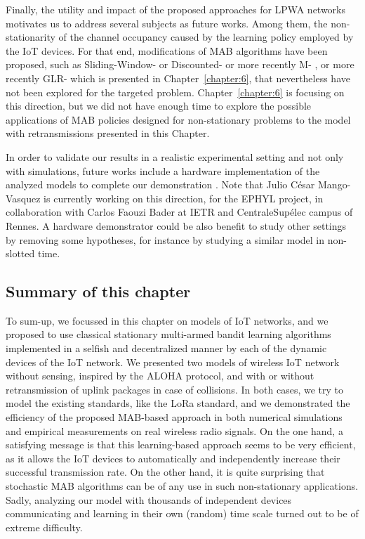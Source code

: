 Finally, the utility and impact of the proposed approaches for LPWA networks motivates us to address several subjects as future works. Among them, the non-stationarity of the channel occupancy caused by the learning policy employed by the IoT devices.
%
For that end, modifications of MAB algorithms have been proposed, such as Sliding-Window-\UCB{} or Discounted-\UCB{} \cite{Garivier11UCBDiscount}
or more recently M-\UCB{} \cite{CaoZhenKvetonXie18},
or more recently GLR-\UCB{} \cite{Besson2019GLRT} which is presented in Chapter~\ref{chapter:6},
that nevertheless have not been explored for the targeted problem.
Chapter~\ref{chapter:6} is focusing on this direction, but we did not have enough time to explore the possible applications of MAB policies designed for non-stationary problems to the model with retransmissions presented in this Chapter.

In order to validate our results in a realistic experimental setting and not only with simulations, future works include a hardware implementation of the analyzed models to complete our demonstration \cite{Besson2019WCNC}.
Note that Julio César Mango-Vasquez is currently working on this direction, for the EPHYL project, in collaboration with Carlos Faouzi Bader at IETR and CentraleSupélec campus of Rennes.
%
A hardware demonstrator could be also benefit to study other settings by removing some hypotheses, for instance by studying a similar model in non-slotted time.


\subsection*{Summary of this chapter}

To sum-up, we focussed in this chapter on models of IoT networks, and we proposed to use classical stationary multi-armed bandit learning algorithms implemented in a selfish and decentralized manner by each of the dynamic devices of the IoT network.
We presented two models of wireless IoT network without sensing, inspired by the ALOHA protocol, and with or without retransmission of uplink packages in case of collisions.
In both cases, we try to model the existing standards, like the LoRa standard, and we demonstrated the efficiency of the proposed MAB-based approach in both numerical simulations and empirical measurements on real wireless radio signals.
%
On the one hand, a satisfying message is that this learning-based approach seems to be very efficient, as it allows the IoT devices to automatically and independently increase their successful transmission rate.
On the other hand, it is quite surprising that stochastic MAB algorithms can be of any use in such non-stationary applications.
Sadly, analyzing our model with thousands of independent devices communicating and learning in their own (random) time scale turned out to be of extreme difficulty.



